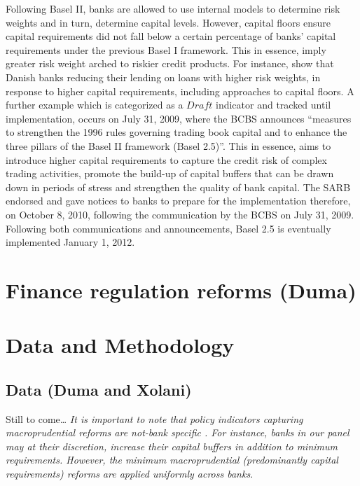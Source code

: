 \documentclass[
  letterpaper,
  DIV=11,
  numbers=noendperiod]{scrartcl}
\begin{document}
Following Basel II, banks are allowed to use internal models to
determine risk weights and in turn, determine capital levels. However,
capital floors ensure capital requirements did not fall below a certain
percentage of banks' capital requirements under the previous Basel I
framework\citep{basel06}. This in essence, imply greater risk weight
arched to riskier credit products. For instance,
\cite{imbierowicz2018time} show that Danish banks reducing their lending
on loans with higher risk weights, in response to higher capital
requirements, including approaches to capital floors. A further example
which is categorized as a \(Draft\) indicator and tracked until
implementation, occurs on July 31, 2009, where the BCBS announces
``measures to strengthen the 1996 rules governing trading book capital
and to enhance the three pillars of the Basel II framework (Basel
2.5)''. This in essence, aims to introduce higher capital requirements
to capture the credit risk of complex trading activities, promote the
build-up of capital buffers that can be drawn down in periods of stress
and strengthen the quality of bank capital\citep{basel09}. The SARB
endorsed and gave notices to banks to prepare for the implementation
therefore, on October 8, 2010, following the communication by the BCBS
on July 31, 2009. Following both communications and announcements, Basel
2.5 is eventually implemented January 1, 2012.

\hypertarget{finance-regulation-reforms-duma}{%
\section{Finance regulation reforms
(Duma)}\label{finance-regulation-reforms-duma}}

\hypertarget{data-and-methodology}{%
\section{Data and Methodology}\label{data-and-methodology}}

\hypertarget{data-duma-and-xolani}{%
\subsection{Data (Duma and Xolani)}\label{data-duma-and-xolani}}

Still to come\ldots{}
\textit{It is important to note that policy indicators capturing macroprudential reforms are not-bank specific . For instance, banks in our panel may at their discretion, increase their capital buffers in addition to minimum requirements. However, the minimum macroprudential (predominantly capital requirements) reforms are applied uniformly across banks}.
\end{document}
